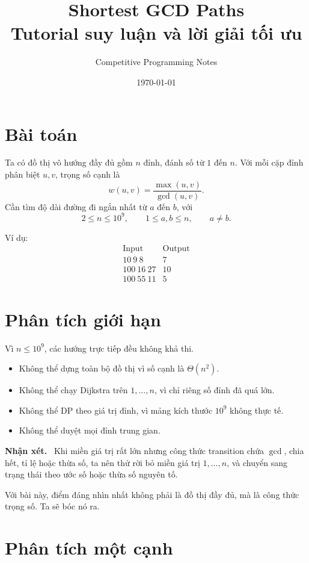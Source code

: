 \documentclass[11pt,a4paper]{article}
\title{\Huge\bfseries Shortest GCD Paths\\[4pt]\Large Tutorial suy luận và lời giải tối ưu}
\author{Competitive Programming Notes}
\date{\today}
\newenvironment{insight}
{\par\medskip\noindent\begin{minipage}{0.96\linewidth}\color{deepblue}\textbf{Nhận xét.}\ }
{\end{minipage}\par\medskip}
\begin{document}
\maketitle
\tableofcontents
\newpage

\section{Bài toán}

Ta có đồ thị vô hướng đầy đủ gồm \(n\) đỉnh, đánh số từ \(1\) đến \(n\). Với mỗi cặp đỉnh phân biệt \(u,v\), trọng số cạnh là
\[
  w(u,v)=\frac{\max(u,v)}{\gcd(u,v)}.
\]
Cần tìm độ dài đường đi ngắn nhất từ \(a\) đến \(b\), với
\[
  2\le n\le 10^9,\qquad 1\le a,b\le n,\qquad a\ne b.
\]

Ví dụ:
\[
\begin{array}{c|c}
\text{Input} & \text{Output}\\
\hline
10\ 9\ 8 & 7\\
100\ 16\ 27 & 10\\
100\ 55\ 11 & 5
\end{array}
\]

\section{Phân tích giới hạn}

Vì \(n\le 10^9\), các hướng trực tiếp đều không khả thi.

\begin{itemize}
  \item Không thể dựng toàn bộ đồ thị vì số cạnh là \(\Theta(n^2)\).
  \item Không thể chạy Dijkstra trên \(1,\ldots,n\), vì chỉ riêng số đỉnh đã quá lớn.
  \item Không thể DP theo giá trị đỉnh, vì mảng kích thước \(10^9\) không thực tế.
  \item Không thể duyệt mọi đỉnh trung gian.
\end{itemize}

\begin{insight}
Khi miền giá trị rất lớn nhưng công thức transition chứa \(\gcd\), chia hết, tỉ lệ hoặc thừa số, ta nên thử rời bỏ miền giá trị \(1,\ldots,n\), và chuyển sang trạng thái theo ước số hoặc thừa số nguyên tố.
\end{insight}

Với bài này, điểm đáng nhìn nhất không phải là đồ thị đầy đủ, mà là công thức trọng số. Ta sẽ bóc nó ra.

\section{Phân tích một cạnh}
\end{document}

